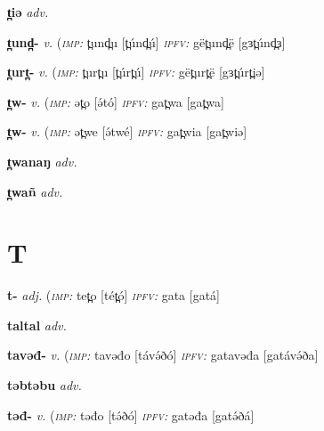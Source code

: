 \newentry
\headword\textbf{t̪iə}  
\ipa{[t̪íə]}
\synpos\textit{adv.} 

\newentry
\headword\textbf{t̪und̪-}  
\ipa{[t̪únd̪-]}
\synpos\textit{v.} 
\imperative(\textit {\textsc{imp:}} t̪und̪u [t̪únd̪ú]  
\imperfective\textit{\textsc{ipfv:}} gët̪und̪ë [gɜt̪únd̪ɜ]

\newentry
\headword\textbf{t̪urt̪-}  
\ipa{[t̪úrt̪-]}
\synpos\textit{v.} 
\imperative(\textit {\textsc{imp:}} t̪urt̪u [t̪úrt̪ú]  
\imperfective\textit{\textsc{ipfv:}} gët̪urt̪ë [gɜt̪úrt̪iə]

\newentry
\headword\textbf{t̪w-}  
\ipa{[t̪w-]}
\synpos\textit{v.} 
\imperative(\textit {\textsc{imp:}} ət̪o [ə́tó]	%
\imperfective\textit{\textsc{ipfv:}} gat̪wa [gat̪wa] 

\newentry
\headword\textbf{t̪w-}  
\ipa{[t̪w-]}
\synpos\textit{v.} 
\imperative(\textit {\textsc{imp:}} ət̪we [ə́twé]	
\imperfective\textit{\textsc{ipfv:}} gat̪wia [gat̪wiə] 

\newentry
\headword\textbf{t̪wanaŋ}  
\ipa{[t̪wánáŋ]}
\synpos\textit{adv.} 

\newentry
\headword\textbf{t̪wañ}  
\ipa{[t̪wáɲ]}
\synpos\textit{adv.} 

\section*{T}\label{T}

\newentry
\headword\textbf{t-}  
\ipa{[t-]}
\synpos\textit{adj.} 
\imperative(\textit {\textsc{imp:}} tet̪o [tét̪ó]	
\imperfective\textit{\textsc{ipfv:}} gata [gatá]

\newentry
\headword\textbf{taltal}  
\ipa{[táltal]}
\synpos\textit{adv.} 

\newentry
\headword\textbf{tavəđ-}  
\ipa{[távə́ð-]}
\synpos\textit{v.} 
\imperative(\textit {\textsc{imp:}} tavəđo [távə́ðó]	
\imperfective\textit{\textsc{ipfv:}} gatavəđa [gatávə́ða]

\newentry
\headword\textbf{təbtəbu}  
\ipa{[təb(ə́)tə́bu]}
\synpos\textit{adv.} 

\newentry
\headword\textbf{təđ-}  
\ipa{[tə́ð-]}
\synpos\textit{v.} 
\imperative(\textit {\textsc{imp:}} təđo [tə́ðó]	
\imperfective\textit{\textsc{ipfv:}} gatəđa [gatə́ðá]

